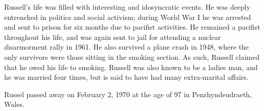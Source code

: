 \documentclass[../../../include/open-logic-section]{subfiles}
\begin{document}
Russell's life was filled with interesting and idosyncratic events. He was deeply entrenched
in politics and social activism; during World War I he was 
arrested and sent to prison for six months due to pacifist activities. He remained a pacifist
throughout his life, and was again sent to jail for attending a nuclear disarmorment rally 
in 1961. He also survived a plane crash in 1948, where the only survivors were those
sitting in the smoking section. As such, Russell claimed that he owed his life to smoking.
Russell was also known to be a ladies man, and he was married four times, but is said to
have had many extra-marital affairs.

Russel passed away on February 2, 1970 at the age of 97 in Penrhyndeudraeth, Wales.
\end{document}
